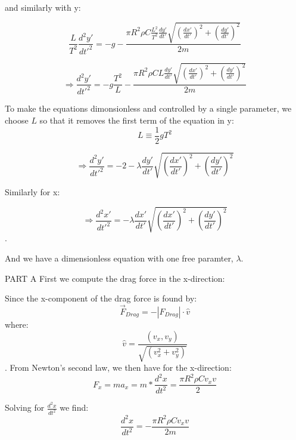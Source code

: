\documentclass[11pt]{article}
\begin{document}
and similarly with y: 

\begin{equation}
    \frac{L}{T^2}\frac{d^2y'}{dt'^2}=-g-\frac{\pi R^2 \rho C \frac{L^2}{T^2}\frac{dy'}{dt'}\sqrt{(\frac{dx'}{dt'})^2+(\frac{dy'}{dt'})^2}}{2m}
\end{equation}


\begin{equation}
    \Rightarrow \frac{d^2y'}{dt'^2}=-g\frac{T^2}{L}-\frac{\pi R^2 \rho C L\frac{dy'}{dt'}\sqrt{(\frac{dx'}{dt'})^2+(\frac{dy'}{dt'})^2}}{2m}
\end{equation}

To make the equations dimonsionless and controlled by a single parameter, we choose $L$ so that it removes the first term of the equation in y:
\begin{equation}
    L\equiv \frac{1}{2}gT^2
\end{equation}


\begin{equation}
    \Rightarrow \frac{d^2y'}{dt'^2}=-2-\lambda \frac{dy'}{dt'}\sqrt{(\frac{dx'}{dt'})^2+(\frac{dy'}{dt'})^2}
\end{equation}

Similarly for x:

\begin{equation}
    \Rightarrow \frac{d^2x'}{dt'^2}=-\lambda\frac{dx'}{dt'}\sqrt{(\frac{dx'}{dt'})^2+(\frac{dy'}{dt'})^2}
\end{equation}.

And we have a dimensionless equation with one free paramter, $\lambda$.


PART A
First we compute the drag force in the x-direction:

Since the x-component of the drag force is found by: 
\begin{equation}
    \overrightarrow{F}_ {Drag}=-|F_{Drag}| \cdot  \widehat{v} 
\end{equation}
where:
\begin{equation}
    \widehat{v}=\frac{(v_x,v_y)}{\sqrt{(v_x^2+v_y^2)}}
\end{equation}.
From Newton's second law, we then have for the x-direction:
\begin{equation}
    F_x=ma_x=m*\frac{d^2x}{dt^2}=\frac{\pi R^2 \rho C v_xv}{2}
\end{equation}

Solving for $\frac{d^2x}{dt^2}$ we find: 
\begin{equation}
    \frac{d^2x}{dt^2}=-\frac{\pi R^2 \rho C v_xv}{2m}
\end{equation}
\end{document}
